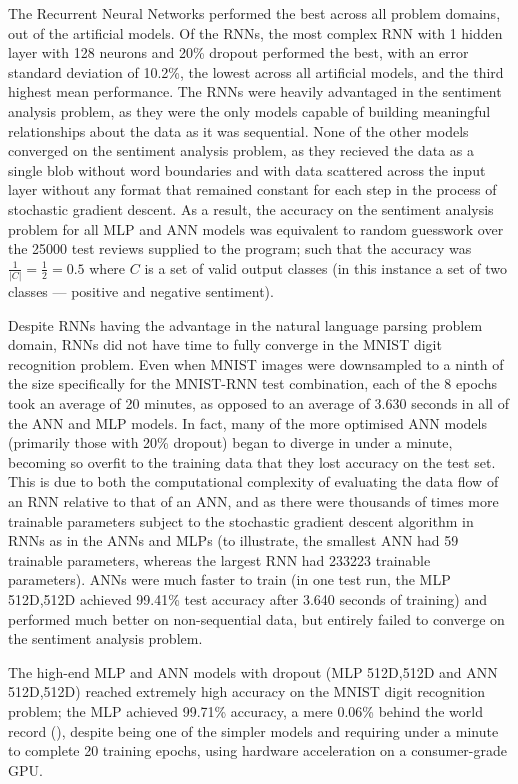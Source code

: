 \documentclass[]{report}
\begin{document}
The Recurrent Neural Networks performed the best across all problem domains, out of the artificial models. Of the RNNs, the most complex RNN with 1 hidden layer with 128 neurons and 20\% dropout performed the best, with an error standard deviation of 10.2\%, the lowest across all artificial models, and the third highest mean performance. The RNNs were heavily advantaged in the sentiment analysis problem, as they were the only models capable of building meaningful relationships about the data as it was sequential. None of the other models converged on the sentiment analysis problem, as they recieved the data as a single blob without word boundaries and with data scattered across the input layer without any format that remained constant for each step in the process of stochastic gradient descent. As a result, the accuracy on the sentiment analysis problem for all MLP and ANN models was equivalent to random guesswork over the 25000 test reviews supplied to the program; such that the accuracy was $\frac{1}{|C|} = \frac{1}{2} = 0.5$ where $C$ is a set of valid output classes (in this instance a set of two classes --- positive and negative sentiment).

Despite RNNs having the advantage in the natural language parsing problem domain, RNNs did not have time to fully converge in the MNIST digit recognition problem. Even when MNIST images were downsampled to a ninth of the size specifically for the MNIST-RNN test combination, each of the 8 epochs took an average of 20 minutes, as opposed to an average of 3.630 seconds in all of the ANN and MLP models. In fact, many of the more optimised ANN models (primarily those with 20\% dropout) began to diverge in under a minute, becoming so overfit to the training data that they lost accuracy on the test set. This is due to both the computational complexity of evaluating the data flow of an RNN relative to that of an ANN, and as there were thousands of times more trainable parameters subject to the stochastic gradient descent algorithm in RNNs as in the ANNs and MLPs (to illustrate, the smallest ANN had 59 trainable parameters, whereas the largest RNN had 233223 trainable parameters). ANNs were much faster to train (in one test run, the MLP 512D,512D achieved 99.41\% test accuracy after 3.640 seconds of training) and performed much better on non-sequential data, but entirely failed to converge on the sentiment analysis problem.

The high-end MLP and ANN models with dropout (MLP 512D,512D and ANN 512D,512D) reached extremely high accuracy on the MNIST digit recognition problem; the MLP achieved 99.71\% accuracy, a mere 0.06\% behind the world record (\cite{ciregan2012multi}), despite being one of the simpler models and requiring under a minute to complete 20 training epochs, using hardware acceleration on a consumer-grade GPU.
\end{document}
